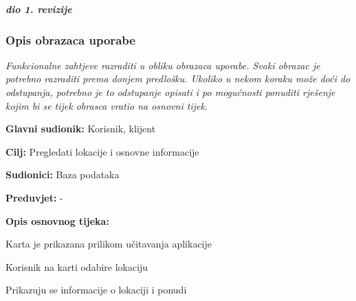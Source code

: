 				\textbf{\textit{dio 1. revizije}}
				
				\subsubsection{Opis obrazaca uporabe}
					\textit{Funkcionalne zahtjeve razraditi u obliku obrazaca uporabe. Svaki obrazac je potrebno razraditi prema donjem predlošku. Ukoliko u nekom koraku može doći do odstupanja, potrebno je to odstupanje opisati i po mogućnosti ponuditi rješenje kojim bi se tijek obrasca vratio na osnovni tijek.}\\
					

					\noindent {}
					\begin{packed_item}
	
						\item \textbf{Glavni sudionik: }Korisnik, klijent
						\item  \textbf{Cilj:} Pregledati lokacije i osnovne informacije
						\item  \textbf{Sudionici:} Baza podataka
						\item  \textbf{Preduvjet:} -
						\item  \textbf{Opis osnovnog tijeka:}
						
						\item[] \begin{packed_enum}
	
							\item Karta je prikazana prilikom učitavanja aplikacije
							\item Korisnik na karti odabire lokaciju
							\item Prikazuju se informacije o lokaciji i ponudi

						\end{packed_enum}
						
					\end{packed_item}
					
